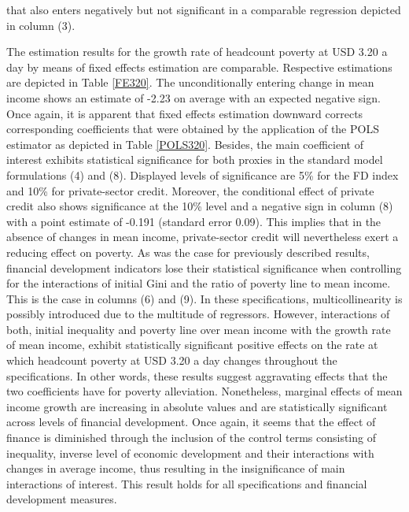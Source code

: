 \documentclass[12pt, a4paper]{article}
\begin{document}
that also enters negatively but not significant in a comparable regression depicted in column (3).

The estimation results for the growth rate of headcount poverty at USD 3.20 a day by means of fixed effects estimation are comparable. Respective estimations are depicted in Table \ref{FE320}. The unconditionally entering change in mean income shows an estimate of -2.23 on average with an expected negative sign. Once again, it is apparent that fixed effects estimation downward corrects corresponding coefficients that were obtained by the application of the POLS estimator as depicted in Table \ref{POLS320}. Besides, the main coefficient of interest exhibits statistical significance for both proxies in the standard model formulations (4) and (8). Displayed levels of significance are 5\% for the FD index and 10\% for private-sector credit. Moreover, the conditional effect of private credit also shows significance at the 10\% level and a negative sign in column (8) with a point estimate of -0.191 (standard error 0.09). This implies that in the absence of changes in mean income, private-sector credit will nevertheless exert a reducing effect on poverty. As was the case for previously described results, financial development indicators lose their statistical significance when controlling for the interactions of initial Gini and the ratio of poverty line to mean income. This is the case in columns (6) and (9). In these specifications, multicollinearity is possibly introduced due to the multitude of regressors. However, interactions of both, initial inequality and poverty line over mean income with the growth rate of mean income, exhibit statistically significant positive effects on the rate at which headcount poverty at USD 3.20 a day changes throughout the specifications. In other words, these results suggest aggravating effects that the two coefficients have for poverty alleviation. Nonetheless, marginal effects of mean income growth are increasing in absolute values and are statistically significant across levels of financial development. Once again, it seems that the effect of finance is diminished through the inclusion of the control terms consisting of inequality, inverse level of economic development and their interactions with changes in average income, thus resulting in the insignificance of main interactions of interest. This result holds for all specifications and financial development measures.
\end{document}
